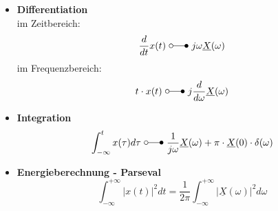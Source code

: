 \begin{mdframed}[style=exercise,nobreak=false]
\begin{itemize}
\[    \]
\item \textbf{Differentiation\\}
    im Zeitbereich:
    \[
        \frac{d}{dt} x(t) \ \laplace\ j\omega\underline{X}(\omega)
    \]
    im Frequenzbereich:
    \[
        t \cdot x(t)\ \laplace\ j \frac{d}{d \omega} \underline{X}(\omega)
    \]
\item \textbf{Integration}
    \[
        \int_{-\infty}^{t} x(\tau) d \tau\ \laplace\ \frac{1}{j \omega} \underline{X}(\omega)+\pi \cdot \underline{X}(0) \cdot \delta(\omega)
    \]
\item \textbf{Energieberechnung - Parseval}
    \[
        \int_{-\infty}^{+\infty}|x(t)|^{2} d t=\frac{1}{2 \pi} \int_{-\infty}^{+\infty}|\underline{X}(\omega)|^{2} d \omega
    \]
\end{itemize}
\end{mdframed}

